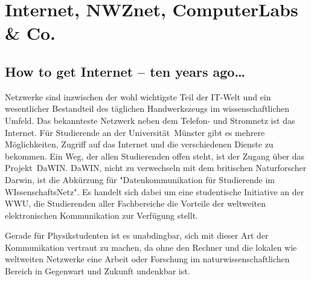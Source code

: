 \section{Internet, NWZnet, ComputerLabs \& Co.}
\begin{multicols}{2}
\subsection*{How to get Internet -- ten years ago\dots}
Netzwerke sind inzwischen der wohl wichtigste Teil der IT-Welt und ein wesentlicher Bestandteil des täglichen Handwerkszeugs im wissenschaftlichen Umfeld. Das bekannteste Netzwerk neben dem Telefon- und Stromnetz ist das Internet. Für Studierende an der Universität~Münster gibt es mehrere Möglichkeiten, Zugriff auf das Internet und die verschiedenen Dienste zu bekommen. Ein Weg, der allen Studierenden offen steht, ist der Zugang über das Projekt~DaWIN. DaWIN, nicht zu verwechseln mit dem britischen Naturforscher Darwin, ist die Abkürzung für "Datenkommunikation für Studierende im WIssenschaftsNetz". Es handelt sich dabei um eine studentische Initiative an der WWU, die Studierenden aller Fachbereiche die Vorteile der weltweiten elektronischen Kommunikation zur Verfügung stellt.

Gerade für Physikstudenten ist es unabdingbar, sich mit dieser Art der Kommunikation vertraut zu machen, da ohne den Rechner und die lokalen wie weltweiten Netzwerke eine Arbeit oder Forschung im naturwissenschaftlichen Bereich in Gegenwart und Zukunft undenkbar ist.


\end{multicols}
